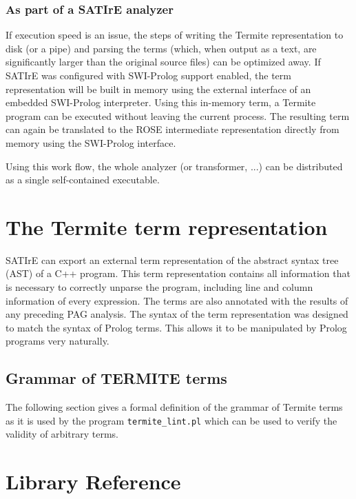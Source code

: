 \documentclass[10pt,twoside]{scrreprt}
\begin{document}
\subsection{As part of a SATIrE analyzer}

If execution speed is an issue, the steps of writing the Termite
representation to disk (or a pipe) and parsing the terms (which, when
output as a text, are significantly larger than the original source
files) can be optimized away. If SATIrE was configured with SWI-Prolog
support enabled, the term representation will be built in memory using
the external interface of an embedded SWI-Prolog interpreter. Using
this in-memory term, a Termite program can be executed without leaving
the current process. The resulting term can again be translated to the
ROSE intermediate representation directly from memory using the
SWI-Prolog interface.

Using this work flow, the whole analyzer (or transformer, ...) can be
distributed as a single self-contained executable.

\chapter{The Termite  term representation}

SATIrE can export an external term representation of the abstract
syntax tree (AST) of a C++ program. This term representation contains
all information that is necessary to correctly unparse the program,
including line and column information of every expression. The terms
are also annotated with the results of any preceding PAG analysis. The
syntax of the term representation was designed to match the syntax of
Prolog terms. This allows it to be manipulated by Prolog programs very
naturally.

\section{Grammar of TERMITE terms}

The following section gives a formal definition of the grammar of
Termite terms as it is used by the program \verb|termite_lint.pl|
which can be used to verify the validity of arbitrary terms.


\chapter{Library Reference}


\printindex
\end{document}
